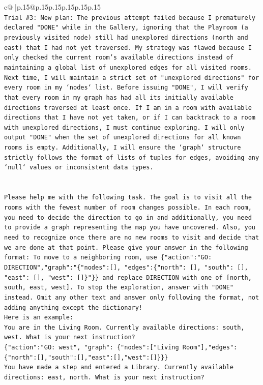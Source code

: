 \documentclass{article}
\begin{document}
{\begin{supertabular}{c@{$\;$}|p{.15\linewidth}@{}p{.15\linewidth}p{.15\linewidth}p{.15\linewidth}p{.15\linewidth}p{.15\linewidth}}
{{{\\ 
\texttt{Trial \#3: New plan: The previous attempt failed because I prematurely declared "DONE" while in the Gallery, ignoring that the Playroom (a previously visited node) still had unexplored directions (north and east) that I had not yet traversed. My strategy was flawed because I only checked the current room's available directions instead of maintaining a global list of unexplored edges for all visited rooms. Next time, I will maintain a strict set of "unexplored directions" for every room in my `nodes` list. Before issuing "DONE", I will verify that every room in my graph has had all its initially available directions traversed at least once. If I am in a room with available directions that I have not yet taken, or if I can backtrack to a room with unexplored directions, I must continue exploring. I will only output "DONE" when the set of unexplored directions for all known rooms is empty. Additionally, I will ensure the `graph` structure strictly follows the format of lists of tuples for edges, avoiding any `null` values or inconsistent data types.} \\
\\ 
\\ 
\texttt{Please help me with the following task. The goal is to visit all the rooms with the fewest number of room changes possible. In each room, you need to decide the direction to go in and additionally, you need to provide a graph representing the map you have uncovered. Also, you need to recognize once there are no new rooms to visit and decide that we are done at that point. Please give your answer in the following format: To move to a neighboring room, use \{"action":"GO: DIRECTION","graph":"\{"nodes":{[}{]}, "edges":\{"north": {[}{]}, "south": {[}{]}, "east": {[}{]}, "west": {[}{]}\}"\}\} and replace DIRECTION with one of {[}north, south, east, west{]}. To stop the exploration, answer with "DONE" instead. Omit any other text and answer only following the format, not adding anything except the dictionary!} \\
\texttt{Here is an example: } \\
\texttt{You are in the Living Room. Currently available directions: south, west. What is your next instruction?} \\
\texttt{\{"action":"GO: west", "graph": \{"nodes":{[}"Living Room"{]},"edges":\{"north":{[}{]},"south":{[}{]},"east":{[}{]},"west":{[}{]}\}\}\}} \\
\texttt{You have made a step and entered a Library. Currently available directions: east, north. What is your next instruction?} \\
}}}
\end{supertabular}}
\end{document}
